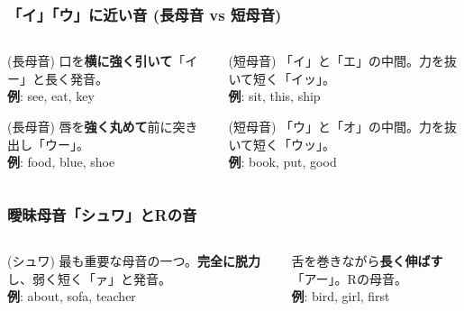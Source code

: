 \documentclass[aspectratio=169,xcolor={dvipsnames,table}]{beamer}
\begin{document}
\begin{frame}
    \frametitle{「イ」「ウ」に近い音 (長母音 vs 短母音)}
     \begin{columns}[T,totalwidth=\textwidth]
        \begin{column}{.45\textwidth}
            \begin{block}{ (長母音)}
                口を\textbf{横に強く引いて}「イー」と長く発音。\\
                \textbf{例}: see, eat, key
            \end{block}
            \begin{block}{(長母音)}
                唇を\textbf{強く丸めて}前に突き出し「ウー」。\\
                \textbf{例}: food, blue, shoe
            \end{block}
        \end{column}
        \begin{column}{.45\textwidth}
            \begin{block}{\textipa{/\textsci /} (短母音)}
                「イ」と「エ」の中間。力を抜いて短く「イッ」。\\
                \textbf{例}: sit, this, ship
            \end{block}
            \begin{block}{\textipa{/\textupsilon /} (短母音)}
                 「ウ」と「オ」の中間。力を抜いて短く「ウッ」。\\
                \textbf{例}: book, put, good
            \end{block}
        \end{column}
    \end{columns}
\end{frame}

\begin{frame}
    \frametitle{曖昧母音「シュワ」とRの音}
    \begin{columns}[T,totalwidth=\textwidth]
        \begin{column}{.45\textwidth}
            \begin{block}{ (シュワ)}
                最も重要な母音の一つ。\textbf{完全に脱力}し、弱く短く「ァ」と発音。\\ \vspace{0.3cm}
                \textbf{例}: about, sofa, teacher
            \end{block}
        \end{column}
        \begin{column}{.45\textwidth}
            \begin{block}{\textipa{/\textrhookschwa :/}}
                舌を巻きながら\textbf{長く伸ばす}「アー」。Rの母音。\\ \vspace{0.3cm}
                \textbf{例}: bird, girl, first
            \end{block}
        \end{column}
    \end{columns}
\end{frame}
\end{document}

